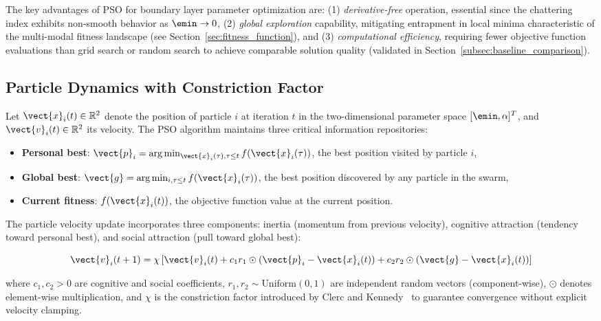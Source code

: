 The key advantages of PSO for boundary layer parameter optimization are: (1) \textit{derivative-free} operation, essential since the chattering index exhibits non-smooth behavior as $\emin \to 0$, (2) \textit{global exploration} capability, mitigating entrapment in local minima characteristic of the multi-modal fitness landscape (see Section~\ref{sec:fitness_function}), and (3) \textit{computational efficiency}, requiring fewer objective function evaluations than grid search or random search to achieve comparable solution quality (validated in Section~\ref{subsec:baseline_comparison}).

\subsection{Particle Dynamics with Constriction Factor}
\label{subsec:particle_dynamics}

Let $\vect{x}_i(t) \in \mathbb{R}^2$ denote the position of particle $i$ at iteration $t$ in the two-dimensional parameter space $[\emin, \alpha]^T$, and $\vect{v}_i(t) \in \mathbb{R}^2$ its velocity. The PSO algorithm maintains three critical information repositories:

\begin{itemize}
    \item \textbf{Personal best}: $\vect{p}_i = \arg\min_{\vect{x}_i(\tau), \tau \leq t} f(\vect{x}_i(\tau))$, the best position visited by particle $i$,
    \item \textbf{Global best}: $\vect{g} = \arg\min_{i,\tau \leq t} f(\vect{x}_i(\tau))$, the best position discovered by any particle in the swarm,
    \item \textbf{Current fitness}: $f(\vect{x}_i(t))$, the objective function value at the current position.
\end{itemize}

The particle velocity update incorporates three components: inertia (momentum from previous velocity), cognitive attraction (tendency toward personal best), and social attraction (pull toward global best):

\begin{equation}
\label{eq:pso_velocity}
\vect{v}_i(t+1) = \chi \left[ \vect{v}_i(t) + c_1 r_1 \odot (\vect{p}_i - \vect{x}_i(t)) + c_2 r_2 \odot (\vect{g} - \vect{x}_i(t)) \right]
\end{equation}

where $c_1, c_2 > 0$ are cognitive and social coefficients, $r_1, r_2 \sim \text{Uniform}(0,1)$ are independent random vectors (component-wise), $\odot$ denotes element-wise multiplication, and $\chi$ is the constriction factor introduced by Clerc and Kennedy~\cite{clerc2002particle} to guarantee convergence without explicit velocity clamping.

